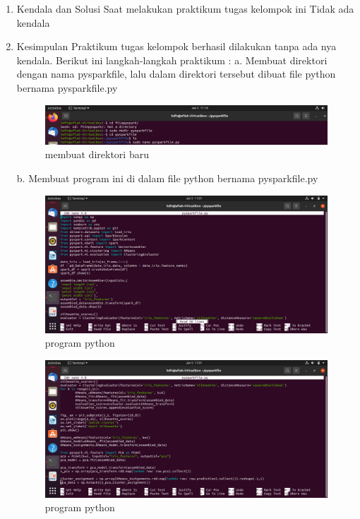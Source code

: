 \begin{enumerate}
\item Kendala dan Solusi
\newline Saat melakukan praktikum tugas kelompok ini Tidak ada kendala 

\item Kesimpulan
\newline Praktikum tugas kelompok berhasil dilakukan tanpa ada nya kendala. Berikut ini langkah-langkah praktikum :
\newline a. Membuat direktori dengan nama pysparkfile, lalu dalam direktori tersebut dibuat file python bernama pysparkfile.py

\begin{figure} [!ht]
\includegraphics[width=\textwidth] {TugasKelompok/Kelompok3/membuatdirektori}
\caption{membuat direktori baru}
\label{gam:hasil tugas kelompok}
\end{figure}

b. Membuat program ini di dalam file python bernama pysparkfile.py

\begin{figure} [!ht]
\includegraphics[width=\textwidth] {TugasKelompok/Kelompok3/programpython1}
\caption{program python}
\label{gam:hasil tugas kelompok}
\end{figure}

\begin{figure} [!ht]
\includegraphics[width=\textwidth] {TugasKelompok/Kelompok3/programpython2}
\caption{program python}
\label{gam:hasil tugas kelompok}
\end{figure}


\end{enumerate}
